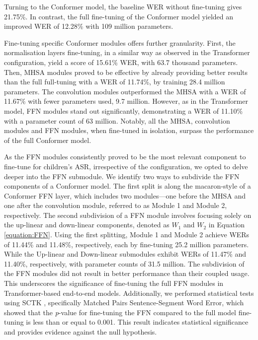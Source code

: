 Turning to the Conformer model, the baseline \ac{WER} without fine-tuning gives 21.75\%. In contrast, the full fine-tuning of the Conformer model yielded an improved \ac{WER} of 12.28\% with 109 million parameters.

Fine-tuning specific Conformer modules offers further granularity. First, the normalisation layers fine-tuning, in a similar way as observed in the Transformer configuration, yield a score of 15.61\% WER, with 63.7 thousand parameters. Then, \ac{MHSA} modules proved to be effective by already providing better results than the full full-tuning with a \ac{WER} of 11.74\%, by training 28.4 million parameters. The convolution modules outperformed the \ac{MHSA} with a \ac{WER} of 11.67\% with fewer parameters used, 9.7 million. However, as in the Transformer model, \ac{FFN} modules stand out significantly, demonstrating a \ac{WER} of 11.10\% with a parameter count of 63 million. Notably, all the \ac{MHSA}, convolution modules and \ac{FFN} modules, when fine-tuned in isolation, surpass the performance of the full Conformer model.


As the \ac{FFN} modules consistently proved to be the most relevant component to fine-tune for children's \ac{ASR}, irrespective of the configuration, we opted to delve deeper into the \ac{FFN} submodule. We identify two ways to subdivide the \ac{FFN} components of a Conformer model. The first split is along the macaron-style of a Conformer \ac{FFN} layer, which includes two modules—one before the \ac{MHSA} and one after the convolution module, referred to as Module 1 and Module 2, respectively. The second subdivision of a \ac{FFN} module involves focusing solely on the up-linear and down-linear components, denoted as $W_1$ and $W_2$ in Equation \ref{equation:FFN}. Using the first splitting, Module 1 and Module 2 achieve \acp{WER} of 11.44\% and 11.48\%, respectively, each by fine-tuning 25.2 million parameters. While the Up-linear and Down-linear submodules exhibit \acp{WER} of 11.47\% and 11.40\%, respectively, with parameter counts of 31.5 million. The subdivision of the \ac{FFN} modules did not result in better performance than their coupled usage. This underscores the significance of fine-tuning the full \ac{FFN} modules in Transformer-based end-to-end models. Additionally, we performed statistical tests using SCTK \cite{SCTK_nist}, specifically Matched Pairs Sentence-Segment Word Error, which showed that the \textit{p}-value for fine-tuning the \ac{FFN} compared to the full model fine-tuning is less than or equal to 0.001. This result indicates statistical significance and provides evidence against the null hypothesis.

